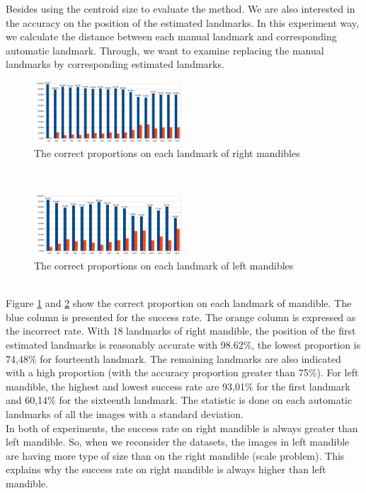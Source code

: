 \documentclass[twoside,twocolumn,10pt]{article}
\begin{document}
Besides using the centroid size to evaluate the method. We are also
interested in the accuracy on the position of the estimated landmarks. In this experiment
way, we calculate the distance between each manual landmark and
corresponding automatic landmark. Through, we want to examine replacing the manual landmarks by corresponding estimated landmarks.
\begin{figure}[htb]
    \centering
    \includegraphics[width=0.5\textwidth]{./images/md_chartlms}
    \caption{The correct proportions on each landmark of right mandibles }
    \label{figmdresultlm}
\end{figure}~\\
\begin{figure}[htb]
    \centering
    \includegraphics[width=0.5\textwidth]{./images/mg_chartlms}
    \caption{The correct proportions on each landmark of left mandibles }
    \label{figmgresultlm}
\end{figure}~\\
Figure \ref{figmdresultlm} and \ref{figmgresultlm} show the correct proportion on each landmark of mandible. The blue column is presented for the success rate. The orange column is expressed as the incorrect rate. With 18 landmarks of right mandible, the position of the first estimated landmarks is reasonably accurate with 98.62\%, the lowest proportion is 74,48\% for fourteenth landmark. The remaining landmarks are also indicated with a high proportion (with the accuracy proportion greater than 75\%). For left mandible, the highest and lowest success rate are 93,01\% for the first landmark and 60,14\% for the sixteenth landmark. The statistic is done on each automatic landmarks of all the images with a standard deviation\cite{bland1996statistics}. \\

In both of experiments, the success rate on right mandible is always greater than left mandible. So, when we reconsider the datasets, the images in left mandible are having more type of size than on the right mandible (scale problem). This explains why the success rate on right mandible is always higher than left mandible.\\
\end{document}
